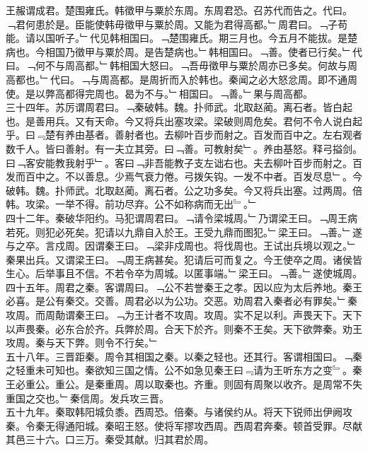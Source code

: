 \documentclass{zhvt-classic}
\begin{document}
\hspace*{2em}王赧谓成君。楚围雍氏。韩徵甲与粟於东周。东周君恐。召苏代而告之。代曰。﹁君何患於是。臣能使韩毋徵甲与粟於周。又能为君得高都。﹂周君曰。﹁子苟能。请以国听子。﹂代见韩相国曰。﹁楚围雍氏。期三月也。今五月不能拔。是楚病也。今相国乃徵甲与粟於周。是告楚病也。﹂韩相国曰。﹁善。使者已行矣。﹂代曰。﹁何不与周高都。﹂韩相国大怒曰。﹁吾毋徵甲与粟於周亦已多矣。何故与周高都也。﹂代曰。﹁与周高都。是周折而入於韩也。秦闻之必大怒忿周。即不通周使。是以弊高都得完周也。曷为不与。﹂相国曰。﹁善。﹂果与周高都。\\
\hspace*{2em}三十四年。苏厉谓周君曰。﹁秦破韩。魏。扑师武。北取赵蔺。离石者。皆白起也。是善用兵。又有天命。今又将兵出塞攻梁。梁破则周危矣。君何不令人说白起乎。曰﹃楚有养由基者。善射者也。去柳叶百步而射之。百发而百中之。左右观者数千人。皆曰善射。有一夫立其旁。曰﹁善。可教射矣﹂。养由基怒。释弓搤剑。曰﹁客安能教我射乎﹂。客曰﹁非吾能教子支左诎右也。夫去柳叶百步而射之。百发而百中之。不以善息。少焉气衰力倦。弓拨矢钩。一发不中者。百发尽息﹂。今破韩。魏。扑师武。北取赵蔺。离石者。公之功多矣。今又将兵出塞。过两周。倍韩。攻梁。一举不得。前功尽弃。公不如称病而无出﹄。﹂\\
\hspace*{2em}四十二年。秦破华阳约。马犯谓周君曰。﹁请令梁城周。﹂乃谓梁王曰。﹁周王病若死。则犯必死矣。犯请以九鼎自入於王。王受九鼎而图犯。﹂梁王曰。﹁善。﹂遂与之卒。言戍周。因谓秦王曰。﹁梁非戍周也。将伐周也。王试出兵境以观之。﹂秦果出兵。又谓梁王曰。﹁周王病甚矣。犯请后可而复之。今王使卒之周。诸侯皆生心。后举事且不信。不若令卒为周城。以匿事端。﹂梁王曰。﹁善。﹂遂使城周。\\
\hspace*{2em}四十五年。周君之秦。客谓周曰。﹁公不若誉秦王之孝。因以应为太后养地。秦王必喜。是公有秦交。交善。周君必以为公功。交恶。劝周君入秦者必有罪矣。﹂秦攻周。而周勣谓秦王曰。﹁为王计者不攻周。攻周。实不足以利。声畏天下。天下以声畏秦。必东合於齐。兵弊於周。合天下於齐。则秦不王矣。天下欲弊秦。劝王攻周。秦与天下弊。则令不行矣。﹂\\
\hspace*{2em}五十八年。三晋距秦。周令其相国之秦。以秦之轻也。还其行。客谓相国曰。﹁秦之轻重未可知也。秦欲知三国之情。公不如急见秦王曰﹃请为王听东方之变﹄。秦王必重公。重公。是秦重周。周以取秦也。齐重。则固有周聚以收齐。是周常不失重国之交也。﹂秦信周。发兵攻三晋。\\
\hspace*{2em}五十九年。秦取韩阳城负黍。西周恐。倍秦。与诸侯约从。将天下锐师出伊阙攻秦。令秦无得通阳城。秦昭王怒。使将军摎攻西周。西周君奔秦。顿首受罪。尽献其邑三十六。口三万。秦受其献。归其君於周。\\
\end{document}
